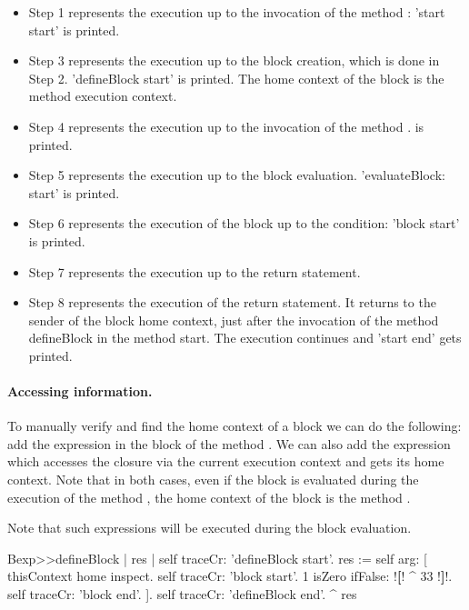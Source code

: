 \documentclass[a4paper,10pt,twoside]{book}
\begin{document}
\begin{itemize}
\item Step 1 represents the execution up to the invocation of the
  method : 'start start' is printed.

\item Step 3 represents the execution up to the block creation, which
  is done in Step 2. 'defineBlock start' is printed. The home context
  of the block is the  method execution context.

\item Step 4 represents the execution up to the invocation of the method
  .  is printed.

\item Step 5 represents the execution up to the block evaluation.
  'evaluateBlock: start' is printed.

\item Step 6 represents the execution of the block up to the
  condition: 'block start' is printed.

\item Step 7 represents the execution up to the return statement.

\item Step 8 represents the execution of the return statement. It
  returns to the sender of the block home context, \ie just after the
  invocation of the method defineBlock in the method start. The
  execution continues and 'start end' gets printed.
\end{itemize}

\paragraph{Accessing information.} 

To manually verify and find the home context of a block we can do the following: add the expression  in the block of the  method . We can also add the expression  which accesses the closure via the current execution context and gets its home context. Note that in both cases, even if the block is evaluated during the execution of the method , the home context of the block is the method .

Note that such expressions will be executed during the block evaluation.

\begin{code}{}
Bexp>>defineBlock
	| res |
	self traceCr: 'defineBlock start'.
	res := self arg: [ thisContext home inspect. self traceCr: 'block start'.
                            1 isZero ifFalse: !\textbf{[}! ^ 33 !\textbf{]}!.
                            self traceCr: 'block end'. ].
	self traceCr: 'defineBlock end'.
	^ res
\end{code}
\end{document}

